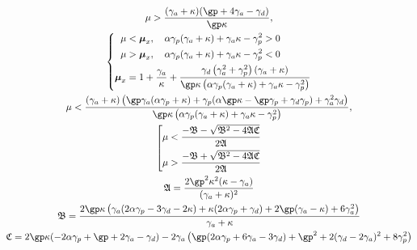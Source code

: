 \documentclass[12pt, notitlepage]{report}
\begin{document}
\begin{gather}
	\mu > \frac{(\gamma_a+\kappa ) (\gp +4 \gamma_a - \gamma_d)}{\gp  \kappa },\\
	\left\{
	\begin{aligned}
		\mu &< \boldsymbol{\mu}_x, \quad \alpha  \gamma_p (\gamma_a+\kappa )+\gamma_a \kappa -\gamma_p^2 > 0  \\
		\mu &> \boldsymbol{\mu}_x,\quad \alpha  \gamma_p (\gamma_a+\kappa )+\gamma_a \kappa -\gamma_p^2 < 0  \\
		\boldsymbol{\mu}_x &= 1 + \frac{\gamma_a}{\kappa } +  \frac{\gamma_d \left(\gamma_a^2+\gamma_p^2\right) (\gamma_a+\kappa )}{\gp  \kappa  \left(\alpha \gamma_p (\gamma_a + \kappa)+ \gamma_a \kappa -\gamma_p^2\right)}
	\end{aligned}
	\right.\\
	\mu < \frac{(\gamma_a+\kappa ) \left(\gp  \gamma_a (\alpha  \gamma_p+\kappa )+\gamma_p (\alpha  \gp  \kappa -\gp  \gamma_p+\gamma_d \gamma_p)+\gamma_a^2 \gamma_d\right)}{\gp  \kappa  \left(\alpha  \gamma_p (\gamma_a+\kappa )+\gamma_a \kappa -\gamma_p^2\right)},\\
	\left[ \begin{aligned}
		\mu < \frac{-\mathfrak{B} - \sqrt{\mathfrak{B}^2 - 4\mathfrak{A}\mathfrak{C}}}{2\mathfrak{A}} \\
		\mu > \frac{-\mathfrak{B} + \sqrt{\mathfrak{B}^2 - 4\mathfrak{A}\mathfrak{C}}}{2\mathfrak{A}} 
	\end{aligned} \right. \\
	\mathfrak{A} = \frac{2 \gp ^2 \kappa ^2 (\kappa -\gamma_a)}{(\gamma_a+\kappa )^2}\\
	\mathfrak{B} = 
	\frac{2 \gp  \kappa  \left(\gamma_a (2 \alpha  \gamma_p-3 \gamma_d-2 \kappa )+\kappa  (2 \alpha  \gamma_p+\gamma_d)+2 \gp  (\gamma_a-\kappa )+6 \gamma_a^2\right)}{\gamma_a+\kappa }\\
	\mathfrak{C} = 2 \gp  \kappa  (-2 \alpha  \gamma_p+\gp +2 \gamma_a-\gamma_d)-2 \gamma_a \left(\gp  (2 \alpha  \gamma_p+6 \gamma_a-3 \gamma_d)+\gp ^2+2 (\gamma_d-2 \gamma_a)^2+8 \gamma_p^2\right)
\end{gather}
\end{document}
